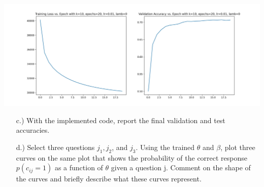 	\begin{center}
			\includegraphics[scale=0.5]{../out/irt.jpg}
	\end{center}
	\begin{enumerate}
	\item [c.)] With the implemented code, report the final validation and test accuracies.
	\item [d.)]Select three questions $j_1, j_2$, and $j_3$. Using the trained $\theta$ and $\beta$, plot three curves on the same plot that shows the probability of the correct response $p(c_{ij} = 1)$ as a function of $\theta$ given a question j. Comment on the shape of the curves  and briefly describe what these curves represent.
\end{enumerate}